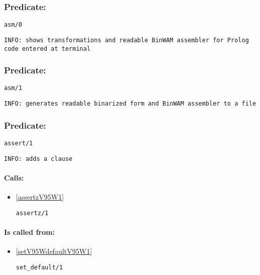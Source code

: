 \subsubsection{Predicate:} \label{asmV95W0}

\begin{verbatim}
asm/0
\end{verbatim}

{\small \begin{verbatim}
INFO: shows transformations and readable BinWAM assembler for Prolog code entered at terminal

\end{verbatim}}

\subsubsection{Predicate:} \label{asmV95W1}

\begin{verbatim}
asm/1
\end{verbatim}

{\small \begin{verbatim}
INFO: generates readable binarized form and BinWAM assembler to a file

\end{verbatim}}

\subsubsection{Predicate:} \label{assertV95W1}

\begin{verbatim}
assert/1
\end{verbatim}

{\small \begin{verbatim}
INFO: adds a clause

\end{verbatim}}
\paragraph{Calls:} 
\begin{itemize}
\item \ref{assertzV95W1} 
\begin{verbatim}
assertz/1
\end{verbatim}

\end{itemize}
\paragraph{Is called from:} 
\begin{itemize}
\item \ref{setV95WdefaultV95W1} 
\begin{verbatim}
set_default/1
\end{verbatim}

\end{itemize}

